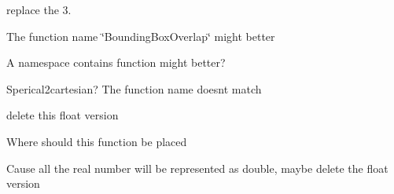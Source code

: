 
\begin{DoxyRefList}
\item[Member \mbox{\hyperlink{class_angle_adcf3b9ce618ebfc8fb83d2c2089afa2f}{Angle\+::Angle}} (double v, Angle\+Type type)]\label{todo__todo000006}%
%
replace the 3.  
\item[Member \mbox{\hyperlink{_bounding_box_8h_aa8342387fe8fb82925e302ba0342a632}{Bounding\+Box\+Union\+Intersect}} (const Bounding\+Box3$<$ Base\+Type $>$ \&b1, const Bounding\+Box3$<$ Base\+Type $>$ \&b2)]\label{todo__todo000002}%
%
The function name \char`\"{}\+Bounding\+Box\+Overlap\char`\"{} might better  
\item[Class \mbox{\hyperlink{class_coord_convertor}{Coord\+Convertor}} ]\label{todo__todo000003}%
%
A namespace contains function might better?  
\item[Member \mbox{\hyperlink{class_coord_convertor_a6f5154f84a5ed35b8602d27f4b7d3450}{Coord\+Convertor\+::cartesian2\+Spherical}} (const Point2d \&p)]\label{todo__todo000004}%
%
Sperical2cartesian? The function name doesn\textquotesingle{}t match  
\item[Member \mbox{\hyperlink{_common_8h_aa4bc628102111f721c678c58c1d81aa1}{fresnel}} (float cos\+ThetaI, float ext\+IOR, float int\+IOR)]\label{todo__todo000008}%
%
delete this float version  
\item[Member \mbox{\hyperlink{_common_8h_a2ad2c6c590e48dd021738bd29c0dbae8}{fresnel}} (double cos\+ThetaI, double ext\+IOR, double int\+IOR)]\label{todo__todo000009}%
%
Where should this function be placed  
\item[Module \mbox{\hyperlink{group___geometry}{Geometry}} ]\label{todo__todo000005}%
%
Cause all the real number will be represented as double, maybe delete the float version ~\newline
  

\end{DoxyRefList}
